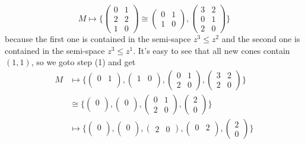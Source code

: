 \documentclass[12pt]{article}
\theoremstyle{definition}
\theoremstyle{plain}
\begin{document}
\[
	M\mapsto \biggl\{
	\begin{pmatrix}
		0&1\\
		2&2\\
		1&0
	\end{pmatrix}\cong
	\begin{pmatrix}
		0&1\\
		1&0
	\end{pmatrix},
	\begin{pmatrix}
		3&2\\
		0&1\\
		2&0
	\end{pmatrix}
\biggr\}
\]
because the first one is contained in the semi-sapce $z^3\leq z^2$
and the second one is contained in the semi-space $z^3\leq z^1$.
It's easy to see that all new cones contain $(1,1)$, so we goto step (1) 
and get
\begin{align*}
	M&\mapsto 
	\biggl\{
	\begin{pmatrix}
		0&1\\
	\end{pmatrix},
	\begin{pmatrix}
		1&0\\
	\end{pmatrix},
	\begin{pmatrix}
		0&1\\
		2&0
	\end{pmatrix},
	\begin{pmatrix}
		3&2\\
		2&0
	\end{pmatrix}
	\biggr\}\\
	 &\cong
	\biggl\{
	\begin{pmatrix}
		0\\
	\end{pmatrix},
	\begin{pmatrix}
		0\\
	\end{pmatrix},
	\begin{pmatrix}
		0&1\\
		2&0
	\end{pmatrix},
	\begin{pmatrix}
		2\\
		0
	\end{pmatrix}
	\biggr\}\\
	&\mapsto
	\biggl\{
	\begin{pmatrix}
		0\\
	\end{pmatrix},
	\begin{pmatrix}
		0\\
	\end{pmatrix},
	\begin{pmatrix}
		2&0
	\end{pmatrix},
	\begin{pmatrix}
		0&2\\
	\end{pmatrix},
	\begin{pmatrix}
		2\\
		0
	\end{pmatrix}
	\biggr\}
\end{align*}
\end{document}
